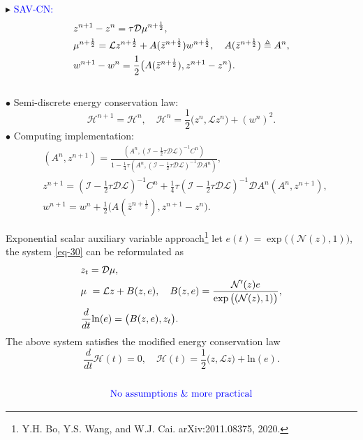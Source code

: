 \documentclass[10pt]{beamer}
\begin{document}
\begin{frame}
\textcolor[rgb]{0,0,1}{$\blacktriangleright$} \textcolor{blue}{SAV-CN:}
\begin{align}\label{eq-33}
\aligned
&z^{n+1}-z^n=\tau\mathcal{D}\mu^{n+\frac{1}{2}},\\
&\mu^{n+\frac{1}{2}}=\mathcal{L}z^{n+\frac{1}{2}}+A(\bar{z}^{n+\frac{1}{2}})w^{n+\frac{1}{2}},\quad A(\bar{z}^{n+\frac{1}{2}})\triangleq A^n,\\
&w^{n+1}-w^n=\frac{1}{2}\big(A(\bar{z}^{n+\frac{1}{2}}),z^{n+1}-z^n\big).
\endaligned
\end{align}\\
\quad\textcolor[rgb]{0,0,1}{$\bullet$} Semi-discrete energy conservation law:
\begin{equation}\label{eq-34}
\mathcal{H}^{n+1}=\mathcal{H}^n,\quad\mathcal{H}^n=\frac{1}{2}\big(z^n,\mathcal{L}z^n\big)+(w^n)^2.
\end{equation} 
\quad\textcolor[rgb]{0,0,1}{$\bullet$} Computing implementation:
\begin{subequations}\label{eq-35}
\begin{align}
&\left(A^n,z^{n+1}\right)=\frac{\left(A^n,(\mathcal{I}-\frac{1}{2}\tau\mathcal{D}\mathcal{L})^{-1}C^n\right)}{1-\frac{1}{4}\tau\left(A^n,(\mathcal{I}-\frac{1}{2}\tau\mathcal{D}\mathcal{L})^{-1}\mathcal{D}A^n\right)},\label{eq-35-a}\\
&z^{n+1}=\left(\mathcal{I}-\frac{1}{2}\tau\mathcal{D}\mathcal{L}\right)^{-1}C^n+\frac{1}{4}\tau\left(\mathcal{I}-\frac{1}{2}\tau\mathcal{D}\mathcal{L}\right)^{-1}\mathcal{D}A^n\left(A^n,z^{n+1}\right),\label{eq-35-b}\\
&w^{n+1}=w^n+\frac{1}{2}\big(A(\bar{z}^{n+\frac{1}{2}}),z^{n+1}-z^n\big).\label{eq-35-c}
\end{align}
\end{subequations} 
\end{frame}

\begin{frame}{Exponential scalar auxiliary variable approach\footnote{Y.H. Bo, Y.S. Wang, and W.J. Cai. arXiv:2011.08375, 2020.}}
let $e(t)=\exp\big((\mathcal{N}(z),1)\big)$, the system \eqref{eq-30} can be reformulated as
\begin{align}\label{eq-36}
\aligned
&z_t=\mathcal{D}\mu,\\
&\mu~=\mathcal{L}z+B(z,e),\quad B(z,e)=\frac{\mathcal{N}'(z)e}{\exp\big((\mathcal{N}(z),1)\big)},\\
&\frac{d}{dt}\mbox{ln}(e)=\big(B(z,e),z_t\big).
\endaligned
\end{align}
The above system satisfies the modified energy conservation law
\begin{equation}\label{eq-37}
\frac{d}{dt}\mathcal{H}(t)=0,\quad\mathcal{H}(t)=\frac{1}{2}\big(z,\mathcal{L}z\big)+\mbox{ln}(e).
\end{equation}\\
\begin{equation*}
\textcolor{blue}{\mbox{No}\ \mbox{assumptions}\ \&\ \mbox{more}\ \mbox{practical}}
\end{equation*} 
\end{frame}
\end{document}

